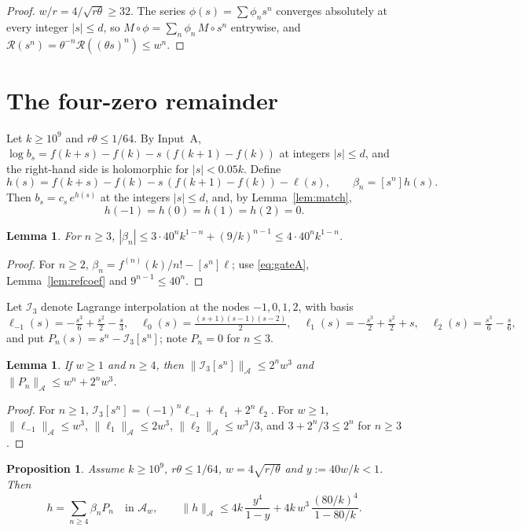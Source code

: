 \documentclass[11pt,a4paper]{article}
\numberwithin{equation}{section}
\newtheorem{proposition}[theorem]{Proposition}
\newtheorem{lemma}[theorem]{Lemma}
\theoremstyle{definition}
\theoremstyle{remark}
\newcommand{\cA}{\mathcal A}
\newcommand{\cR}{\mathcal R}
\newcommand{\cI}{\mathcal I}
\begin{document}
\begin{proof}
$w/r=4/\sqrt{r\theta}\ge32$. The series $\phi(s)=\sum\phi_ns^n$ converges absolutely at every integer $|s|\le d$, so
$M\circ\phi=\sum_n\phi_n\,M\circ s^n$ entrywise, and $\cR(s^n)=\theta^{-n}\cR((\theta s)^n)\le w^n$.
\end{proof}

\section{The four-zero remainder}\label{sec:remainder}

Let $k\ge10^9$ and $r\theta\le1/64$. By Input~A, $\log b_s=f(k+s)-f(k)-s\,(f(k+1)-f(k))$ at integers $|s|\le d$, and the
right-hand side is holomorphic for $|s|<0.05k$. Define
\[
h(s)=f(k+s)-f(k)-s\,(f(k+1)-f(k))-\ell(s),\qquad \beta_n=[s^n]h(s).
\]
Then $b_s=c_s\,e^{h(s)}$ at the integers $|s|\le d$, and, by Lemma~\ref{lem:match},
\[
h(-1)=h(0)=h(1)=h(2)=0 .
\]

\begin{lemma}\label{lem:beta}
For $n\ge3$, $|\beta_n|\le3\cdot40^nk^{1-n}+(9/k)^{n-1}\le4\cdot40^nk^{1-n}$.
\end{lemma}

\begin{proof}
For $n\ge2$, $\beta_n=f^{(n)}(k)/n!-[s^n]\ell$; use \eqref{eq:gateA}, Lemma~\ref{lem:refcoef} and $9^{n-1}\le40^n$.
\end{proof}

Let $\cI_3$ denote Lagrange interpolation at the nodes $-1,0,1,2$, with basis
\[
\ell_{-1}(s)=-\tfrac{s^3}6+\tfrac{s^2}2-\tfrac s3,\quad \ell_0(s)=\tfrac{(s+1)(s-1)(s-2)}{2},\quad
\ell_1(s)=-\tfrac{s^3}2+\tfrac{s^2}2+s,\quad \ell_2(s)=\tfrac{s^3}6-\tfrac s6,
\]
and put $P_n(s)=s^n-\cI_3[s^n]$; note $P_n=0$ for $n\le3$.

\begin{lemma}\label{lem:interp}
If $w\ge1$ and $n\ge4$, then $\|\cI_3[s^n]\|_\cA\le2^nw^3$ and $\|P_n\|_\cA\le w^n+2^nw^3$.
\end{lemma}

\begin{proof}
For $n\ge1$, $\cI_3[s^n]=(-1)^n\ell_{-1}+\ell_1+2^n\ell_2$. For $w\ge1$, $\|\ell_{-1}\|_\cA\le w^3$,
$\|\ell_1\|_\cA\le2w^3$, $\|\ell_2\|_\cA\le w^3/3$, and $3+2^n/3\le2^n$ for $n\ge3$.
\end{proof}

\begin{proposition}\label{prop:majorant}
Assume $k\ge10^9$, $r\theta\le1/64$, $w=4\sqrt{r/\theta}$ and $y:=40w/k<1$. Then
\[
h=\sum_{n\ge4}\beta_nP_n\quad\text{in }\cA_w,\qquad
\|h\|_\cA\le 4k\,\frac{y^4}{1-y}+4k\,w^3\,\frac{(80/k)^4}{1-80/k}.
\]
\end{proposition}
\end{document}
